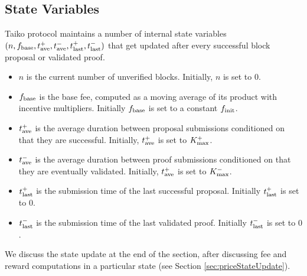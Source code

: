 \documentclass[9pt,oneside]{amsart}
\begin{document}
\begin{multicols}{2}

\subsection{State Variables}
Taiko protocol maintains a number of internal state variables $(n, f_\textnormal{base}, t^+_\textnormal{ave}, t^-_\textnormal{ave}, t^+_\textnormal{last}, t^-_\textnormal{last})$ that get updated after every successful block proposal or validated proof.
\begin{itemize}
    \item $n$ is the current number of unverified blocks. Initially, $n$ is set to $0$.
    \item $f_\textnormal{base}$ is the base fee, computed as a moving average of its product with incentive multipliers. Initially $f_\textnormal{base}$ is set to a constant $f_\textnormal{init}$.
    \item $t^+_\textnormal{ave}$ is the average duration between proposal submissions conditioned on that they are successful. Initially, $t^+_\textnormal{ave}$ is set to $K_\textnormal{max}^+$.
    \item $t^-_\textnormal{ave}$ is the average duration between proof submissions conditioned on that they are eventually validated. Initially, $t^+_\textnormal{ave}$ is set to $K_\textnormal{max}^-$.
    \item $t^+_\textnormal{last}$ is the submission time of the last successful proposal. Initially $t^+_\textnormal{last}$ is set to $0$.
    \item $t^-_\textnormal{last}$ is the submission time of the last validated proof. Initially $t^-_\textnormal{last}$ is set to $0$. 
\end{itemize}
We discuss the state update at the end of the section, after discussing fee and reward computations in a particular state (see Section \ref{sec:priceStateUpdate}). 





\end{multicols}
\end{document}
